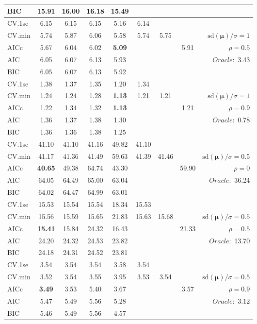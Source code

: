 \begin{table}
\begin{center}
\begin{tabular}{l*{7}{c}|r}
BIC & 15.91 & 16.00 & 16.18 & 15.49 & & & &  \\
 \hline 
CV.1se & 6.15 & 6.15 & 6.15 & 5.16 & 6.14 & & & \\
CV.min & 5.74 & 5.87 & 6.06 & 5.58 & 5.74 & 5.75 & & $\mathrm{sd}(\mathbf{\mu})/\sigma=1$ \\
AICc & 5.67 & 6.04 & 6.02 & {\bf 5.09} & & & 5.91 &  $\rho=0.5$ \\
AIC & 6.05 & 6.07 & 6.13 & 5.93 & & & &  \multirow{2}{*}{$Oracle: $ 3.43} \\
BIC & 6.05 & 6.07 & 6.13 & 5.92 & & & &  \\
 \hline 
CV.1se & 1.38 & 1.37 & 1.35 & 1.20 & 1.34 & & & \\
CV.min & 1.24 & 1.24 & 1.28 & {\bf 1.13} & 1.21 & 1.21 & & $\mathrm{sd}(\mathbf{\mu})/\sigma=1$ \\
AICc & 1.22 & 1.34 & 1.32 & {\bf 1.13} & & & 1.21 &  $\rho=0.9$ \\
AIC & 1.36 & 1.37 & 1.38 & 1.30 & & & &  \multirow{2}{*}{$Oracle: $ 0.78} \\
BIC & 1.36 & 1.36 & 1.38 & 1.25 & & & &  \\
 \hline 
CV.1se & 41.10 & 41.10 & 41.16 & 49.82 & 41.10 & & & \\
CV.min & 41.17 & 41.36 & 41.49 & 59.63 & 41.39 & 41.46 & & $\mathrm{sd}(\mathbf{\mu})/\sigma=0.5$ \\
AICc & {\bf 40.65} & 49.38 & 64.74 & 43.30 & & & 59.90 &  $\rho=0$ \\
AIC & 64.05 & 64.49 & 65.00 & 63.04 & & & &  \multirow{2}{*}{$Oracle: $ 36.24} \\
BIC & 64.02 & 64.47 & 64.99 & 63.01 & & & &  \\
 \hline 
CV.1se & 15.53 & 15.54 & 15.54 & 18.34 & 15.53 & & & \\
CV.min & 15.56 & 15.59 & 15.65 & 21.83 & 15.63 & 15.68 & & $\mathrm{sd}(\mathbf{\mu})/\sigma=0.5$ \\
AICc & {\bf 15.41} & 15.84 & 24.32 & 16.43 & & & 21.33 &  $\rho=0.5$ \\
AIC & 24.20 & 24.32 & 24.53 & 23.82 & & & &  \multirow{2}{*}{$Oracle: $ 13.70} \\
BIC & 24.18 & 24.31 & 24.52 & 23.81 & & & &  \\
 \hline 
CV.1se & 3.54 & 3.54 & 3.54 & 3.58 & 3.54 & & & \\
CV.min & 3.52 & 3.54 & 3.55 & 3.95 & 3.53 & 3.54 & & $\mathrm{sd}(\mathbf{\mu})/\sigma=0.5$ \\
AICc & {\bf 3.49} & 3.53 & 5.40 & 3.67 & & & 3.57 &  $\rho=0.9$ \\
AIC & 5.47 & 5.49 & 5.56 & 5.28 & & & &  \multirow{2}{*}{$Oracle: $ 3.12} \\
BIC & 5.46 & 5.49 & 5.56 & 4.57 & & & &  \\
 \hline 
\end{tabular}
\end{center}
\vspace{-1cm}
\end{table}





